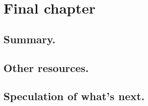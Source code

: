 

\chapter{Final chapter}
\section{Summary.}
\section{Other resources.}
\section{Speculation of what's next.}